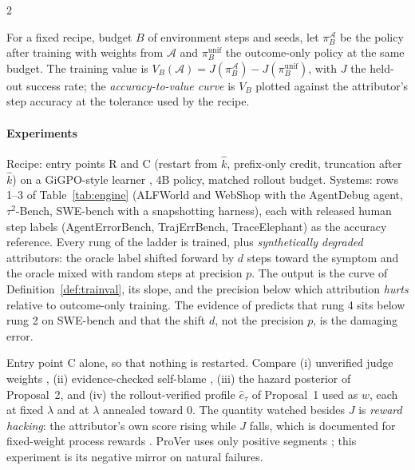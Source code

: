 \begin{multicols}{2}
\begin{definition}\label{def:trainval}
For a fixed recipe, budget $B$ of environment steps and seeds, let $\pi^{\mathcal{A}}_B$ be the policy after training with weights from $\mathcal{A}$ and $\pi^{\mathrm{unif}}_B$ the outcome-only policy at the same budget. The training value is $V_B(\mathcal{A})=J(\pi^{\mathcal{A}}_B)-J(\pi^{\mathrm{unif}}_B)$, with $J$ the held-out success rate; the \emph{accuracy-to-value curve} is $V_B$ plotted against the attributor's step accuracy at the tolerance used by the recipe.
\end{definition}

\paragraph{Experiments}
\begin{description}[leftmargin=1.4em,style=nextline,itemsep=1pt]
\item[A1 --- The accuracy-to-value curve.] Recipe: entry points R and C (restart from $\hat k$, prefix-only credit, truncation after $\hat k$) on a GiGPO-style learner \cite{feng2025gigpo}, 4B policy, matched rollout budget. Systems: rows 1--3 of Table~\ref{tab:engine} (ALFWorld and WebShop with the AgentDebug agent, $\tau^2$-Bench, SWE-bench with a snapshotting harness), each with released human step labels (AgentErrorBench, TrajErrBench, TraceElephant) as the accuracy reference. Every rung of the ladder is trained, plus \emph{synthetically degraded} attributors: the oracle label shifted forward by $d$ steps toward the symptom and the oracle mixed with random steps at precision $p$. The output is the curve of Definition~\ref{def:trainval}, its slope, and the precision below which attribution \emph{hurts} relative to outcome-only training. The evidence of \cite{shen2026epv} predicts that rung 4 sits below rung 2 on SWE-bench and that the shift $d$, not the precision $p$, is the damaging error.
\item[A2 --- Verified negative credit.] Entry point C alone, so that nothing is restarted. Compare (i) unverified judge weights \cite{agentevolver2025}, (ii) evidence-checked self-blame \cite{zhu2026fault}, (iii) the hazard posterior of Proposal~2, and (iv) the rollout-verified profile $\hat e_\tau$ of Proposal~1 used as $\hat w$, each at fixed $\lambda$ and at $\lambda$ annealed toward 0. The quantity watched besides $J$ is \emph{reward hacking}: the attributor's own score rising while $J$ falls, which is documented for fixed-weight process rewards \cite{liu2026vppo,choudhury2025agentprm,zhao2026credithurts}. ProVer uses only positive segments \cite{jung2026prover}; this experiment is its negative mirror on natural failures.

\end{description}
\end{multicols}
